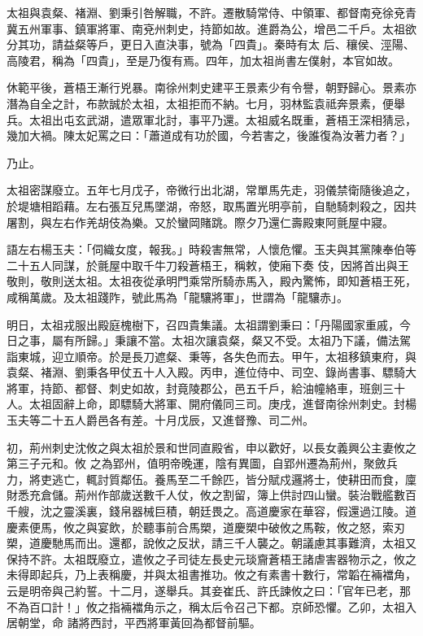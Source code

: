\begin{pinyinscope}
 太祖與袁粲、褚淵、劉秉引咎解職，不許。遷散騎常侍、中領軍、都督南兗徐兗青冀五州軍事、鎮軍將軍、南兗州刺史，持節如故。進爵為公，增邑二千戶。太祖欲分其功，請益粲等戶，更日入直決事，號為「四貴」。秦時有太
 后、穰侯、涇陽、高陵君，稱為「四貴」，至是乃復有焉。四年，加太祖尚書左僕射，本官如故。



 休範平後，蒼梧王漸行兇暴。南徐州刺史建平王景素少有令譽，朝野歸心。景素亦潛為自全之計，布款誠於太祖，太祖拒而不納。七月，羽林監袁祗奔景素，便舉兵。太祖出屯玄武湖，遣眾軍北討，事平乃還。太祖威名既重，蒼梧王深相猜忌，幾加大禍。陳太妃罵之曰：「蕭道成有功於國，今若害之，後誰復為汝著力者？」



 乃止。



 太祖密謀廢立。五年七月戊子，帝微行出北湖，常單馬先走，羽儀禁衛隨後追之，於堤塘相蹈藉。左右張互兒馬墜湖，帝怒，取馬置光明亭前，自馳騎刺殺之，因共屠割，與左右作羌胡伎為樂。又於蠻岡賭跳。際夕乃還仁壽殿東阿氈屋中寢。



 語左右楊玉夫：「伺織女度，報我。」時殺害無常，人懷危懼。玉夫與其黨陳奉伯等二十五人同謀，於氈屋中取千牛刀殺蒼梧王，稱敕，使廂下奏
 伎，因將首出與王敬則，敬則送太祖。太祖夜從承明門乘常所騎赤馬入，殿內驚怖，即知蒼梧王死，咸稱萬歲。及太祖踐阼，號此馬為「龍驤將軍」，世謂為「龍驤赤」。



 明日，太祖戎服出殿庭槐樹下，召四貴集議。太祖謂劉秉曰：「丹陽國家重戚，今日之事，屬有所歸。」秉讓不當。太祖次讓袁粲，粲又不受。太祖乃下議，備法駕詣東城，迎立順帝。於是長刀遮粲、秉等，各失色而去。甲午，太祖移鎮東府，與袁粲、褚淵、劉秉各甲仗五十人入殿。丙申，進位侍中、司空、錄尚書事、驃騎大將軍，持節、都督、刺史如故，封竟陵郡公，邑五千戶，給油幢絡車，班劍三十人。太祖固辭上命，即驃騎大將軍、開府儀同三司。庚戌，進督南徐州刺史。封楊玉夫等二十五人爵邑各有差。十月戊辰，又進督豫、司二州。



 初，荊州刺史沈攸之與太祖於景和世同直殿省，申以歡好，以長女義興公主妻攸之第三子元和。攸
 之為郢州，值明帝晚運，陰有異圖，自郢州遷為荊州，聚斂兵力，將吏逃亡，輒討質鄰伍。養馬至二千餘匹，皆分賦戍邏將士，使耕田而食，廩財悉充倉儲。荊州作部歲送數千人仗，攸之割留，簿上供討四山蠻。裝治戰艦數百千艘，沈之靈溪裏，錢帛器械巨積，朝廷畏之。高道慶家在華容，假還過江陵。道慶素便馬，攸之與宴飲，於聽事前合馬槊，道慶槊中破攸之馬鞍，攸之怒，索刃槊，道慶馳馬而出。還都，說攸之反狀，請三千人襲之。朝議慮其事難濟，太祖又保持不許。太祖既廢立，遣攸之子司徒左長史元琰齎蒼梧王諸虐害器物示之，攸之未得即起兵，乃上表稱慶，并與太祖書推功。攸之有素書十數行，常韜在裲襠角，云是明帝與己約誓。十二月，遂舉兵。其妾崔氏、許氏諫攸之曰：「官年已老，那不為百口計！」攸之指裲襠角示之，稱太后令召己下都。京師恐懼。乙卯，太祖入居朝堂，命
 諸將西討，平西將軍黃回為都督前驅。




\end{pinyinscope}
